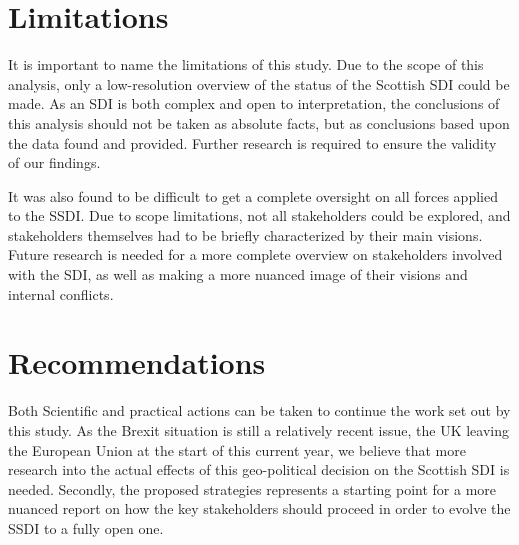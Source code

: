 \newpage
\section{Limitations}

It is important to name the limitations of this study. Due to the scope of this analysis, only a low-resolution overview of the status of the Scottish SDI could be made. As an SDI is both complex and open to interpretation, the conclusions of this analysis should not be taken as absolute facts, but as conclusions based upon the data found and provided. Further research is required to ensure the validity of our findings. 

It was also found to be difficult to get a complete oversight on all forces applied to the SSDI. Due to scope limitations, not all stakeholders could be explored, and stakeholders themselves had to be briefly characterized by their main visions. Future research is needed for a more complete overview on stakeholders involved with the SDI, as well as making a more nuanced image of their visions and internal conflicts. 


\section{Recommendations} 

Both Scientific and practical actions can be taken to continue the work set out by this study. As the Brexit situation is still a relatively recent issue, the UK leaving the European Union at the start of this current year, we believe that more research into the actual effects of this geo-political decision on the Scottish SDI is needed. Secondly, the proposed strategies represents a starting point for a more nuanced report on how the key stakeholders should proceed in order to evolve the SSDI to a fully open one. 